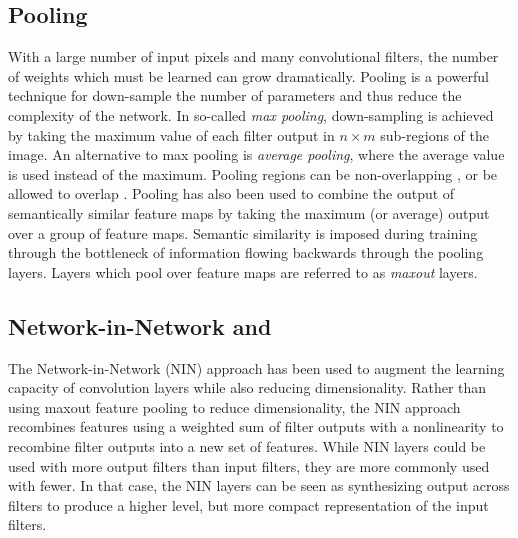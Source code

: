 \subsection{Pooling}

With a large number of input pixels and many convolutional filters, the number of weights which must be learned can grow dramatically.
Pooling \cite{lecun2010convolutional} is a powerful technique for down-sample the number of parameters and thus reduce the complexity of the network.
In so-called \textit{max pooling}, down-sampling is achieved by taking the maximum value of each filter output in $n \times m$ sub-regions of the image.
An alternative to max pooling is \textit{average pooling}, where the average value is used instead of the maximum.  Pooling regions can be non-overlapping \cite{lecun2010convolutional}, or be allowed  to overlap \cite{szegedy2014going,krizhevsky2012imagenet}.
Pooling has also been used to combine the output of semantically similar feature maps by taking the maximum (or average) output over a group of feature maps\cite{lecun2015deep}.
Semantic similarity is imposed during training through the bottleneck of information flowing backwards through the pooling layers.  Layers which pool over feature maps are referred to as \textit{maxout} layers.

\subsection{Network-in-Network and \googlenet}

The Network-in-Network (NIN) \cite{lin2013network} approach has been used to augment the learning capacity of convolution layers while also reducing dimensionality.
Rather than using maxout feature pooling to reduce dimensionality, the NIN approach recombines features using a weighted sum of filter outputs with a \relu nonlinearity to recombine filter outputs into a new set of features.
While NIN layers could be used with more output filters than input filters, they are more commonly used with fewer.
In that case, the NIN layers can be seen as synthesizing output across filters to produce a higher level, but more compact representation of the input filters.

